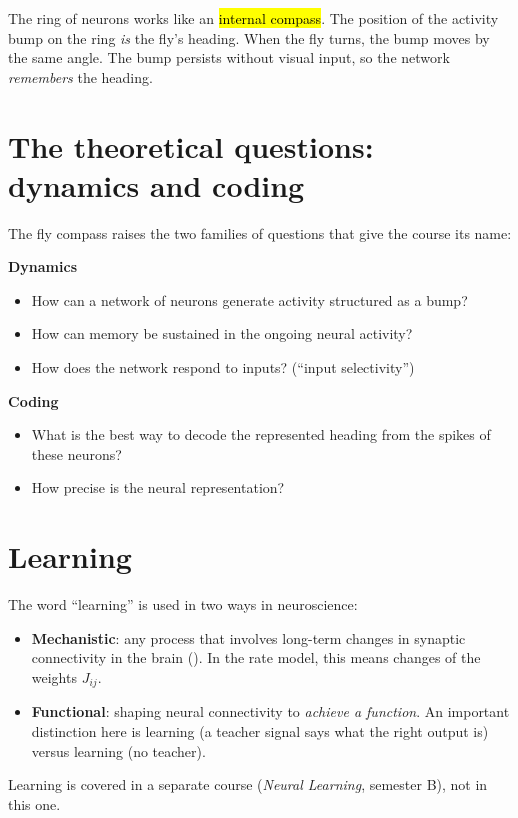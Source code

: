 \begin{intuition}
The ring of neurons works like an \hl{internal compass}. The position of the activity bump on the ring \emph{is} the fly's
heading. When the fly turns, the bump moves by the same angle. The bump persists without visual input, so the network \emph{remembers} the heading.
\end{intuition}

\section{The theoretical questions: dynamics and coding}

The fly compass raises the two families of questions that give the course its name:

\begin{plainbox}
\textbf{\textcolor{ppink}{Dynamics}}
\begin{itemize}
  \item How can a network of neurons generate activity structured as a bump?
  \item How can memory be sustained in the ongoing neural activity?
  \item How does the network respond to inputs? (``input selectivity'')
\end{itemize}
\textbf{\textcolor{ppink}{Coding}}
\begin{itemize}
  \item What is the best way to decode the represented heading from the spikes of these neurons?
  \item How precise is the neural representation?
\end{itemize}
\end{plainbox}

\section{Learning}

The word ``learning'' is used in two ways in neuroscience:
\begin{defn}
\begin{itemize}
  \item \textbf{Mechanistic}: any process that involves long-term changes in synaptic connectivity in the brain
        (). In the rate model, this means changes of the weights $J_{ij}$.
  \item \textbf{Functional}: shaping neural connectivity to \emph{achieve a function}. An important distinction here is
         learning (a teacher signal says what the right output is) versus  learning (no teacher).
\end{itemize}
\end{defn}
Learning is covered in a separate course (\emph{Neural Learning}, semester B), not in this one.

